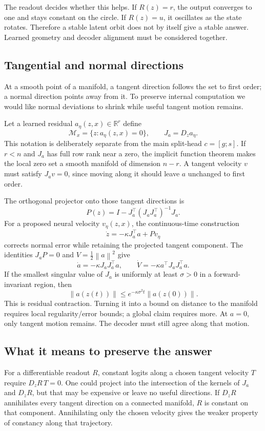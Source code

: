 \documentclass[11pt,a4paper]{article}
\newcommand{\norm}[1]{\left\lVert #1\right\rVert}
\begin{document}
The readout decides whether this helps. If $R(z)=r$, the output converges to one and stays constant on the circle. If $R(z)=u$, it oscillates as the state rotates. Therefore a stable latent orbit does not by itself give a stable answer. Learned geometry and decoder alignment must be considered together.

\subsection{Tangential and normal directions}
At a smooth point of a manifold, a tangent direction follows the set to first order; a normal direction points away from it. To preserve internal computation we would like normal deviations to shrink while useful tangent motion remains.

Let a learned residual $a_\eta(z,x)\in\mathbb R^r$ define
\[
\mathcal M_x=\{z:a_\eta(z,x)=0\},\qquad J_a=D_z a_\eta.
\]
This notation is deliberately separate from the main split-head $c=[g;s]$. If $r<n$ and $J_a$ has full row rank near a zero, the implicit function theorem makes the local zero set a smooth manifold of dimension $n-r$. A tangent velocity $v$ must satisfy $J_av=0$, since moving along it should leave $a$ unchanged to first order.

The orthogonal projector onto those tangent directions is
\[
P(z)=I-J_a^\top(J_aJ_a^\top)^{-1}J_a.
\]
For a proposed neural velocity $v_\eta(z,x)$, the continuous-time construction
\begin{equation}
\dot z=-\kappa J_a^\top a+Pv_\eta\label{eq:tangent}
\end{equation}
corrects normal error while retaining the projected tangent component. The identities $J_aP=0$ and $V=\frac12\norm{a}^2$ give
\[
\dot a=-\kappa J_aJ_a^\top a,
\qquad\dot V=-\kappa a^\top J_aJ_a^\top a.
\]
If the smallest singular value of $J_a$ is uniformly at least $\sigma>0$ in a forward-invariant region, then
\[
\norm{a(z(t))}\le e^{-\kappa\sigma^2t}\norm{a(z(0))}.
\]
This is residual contraction. Turning it into a bound on distance to the manifold requires local regularity/error bounds; a global claim requires more. At $a=0$, only tangent motion remains. The decoder must still agree along that motion.

\subsection{What it means to preserve the answer}
For a differentiable readout $R$, constant logits along a chosen tangent velocity $T$ require $D_zR\,T=0$. One could project into the intersection of the kernels of $J_a$ and $D_zR$, but that may be expensive or leave no useful directions. If $D_zR$ annihilates every tangent direction on a connected manifold, $R$ is constant on that component. Annihilating only the chosen velocity gives the weaker property of constancy along that trajectory.
\end{document}
